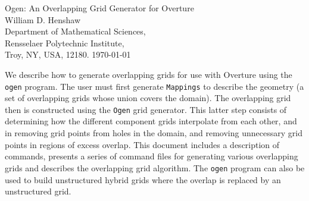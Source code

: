 \documentclass[xcolor=rgb,svgnames,dvipsnames]{article}
\begin{document}
\baselineskip
{}
\begin{flushleft}
{\Large
Ogen: An Overlapping Grid Generator for Overture \\
}
\vspace{2\baselineskip}
William D. Henshaw  \\
Department of Mathematical Sciences, \\
Rensselaer Polytechnic Institute, \\
Troy, NY, USA, 12180.
\vspace{2\baselineskip}
\today 

\vspace{4\baselineskip}



We describe how to generate overlapping grids for use with Overture using the
{\tt ogen} program. The user must first generate {\tt Mappings} to describe the
geometry (a set of overlapping grids whose union covers the domain). The overlapping
grid then is constructed using the {\tt Ogen} grid generator. This latter step consists
of determining how the different component grids interpolate from each other, and in
removing grid points from holes in the domain, and removing unnecessary grid points 
in regions of excess overlap. This document includes a description of commands, presents
a series of command files for generating various overlapping grids and describes the
overlapping grid algorithm. The {\tt ogen} program can also be used to build unstructured
hybrid grids where the overlap is replaced by an unstructured grid.
\end{flushleft}
\end{document}
